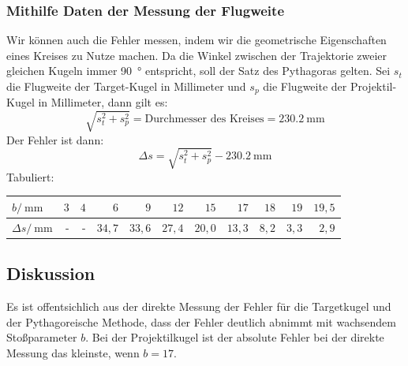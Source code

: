 \documentclass[twoside]{article}
\begin{document}
        \subsubsection{Mithilfe Daten der Messung der Flugweite}
            Wir können auch die Fehler messen, indem wir die geometrische Eigenschaften eines Kreises zu Nutze machen. Da die Winkel zwischen der Trajektorie zweier gleichen Kugeln immer \SI{90}{\degree} entspricht, soll der Satz des Pythagoras gelten. Sei $s_t$ die Flugweite der Target-Kugel in Millimeter und $s_p$ die Flugweite der Projektil-Kugel in Millimeter, dann gilt es:
            \begin{equation}
                \sqrt{s_t^2 + s_p^2} = \text{Durchmesser des Kreises} = \SI{230.2}{\milli\meter}
            \end{equation}
            Der Fehler ist dann:
            \begin{equation}
                \Delta s = \sqrt{s_t^2 + s_p^2} - \SI{230.2}{\milli\meter}
            \end{equation}
            Tabuliert:
            \begin{center}
                \begin{tabular}{l rrrrrrrrrr}
                    \toprule
                    $b / \SI{}{\milli\meter}$ & $3$ & $4$ & $6$ & $9$ & $12$ & $15$ & $17$ & $18$ & $19$ & $19,5$ \\
                    \midrule
                    $\Delta s / \SI{}{\milli\meter}$ & - & - & $34,7$ & $33,6$ & $27,4$ & $20,0$ & $13,3$ & $8,2$ & $3,3$ & $2,9$ \\
                    \bottomrule
                \end{tabular}
            \end{center}

    \subsection{Diskussion}
        Es ist offentsichlich aus der direkte Messung der Fehler für die Targetkugel und der Pythagoreische Methode, dass der Fehler deutlich abnimmt mit wachsendem Stoßparameter $b$. Bei der Projektilkugel ist der absolute Fehler bei der direkte Messung das kleinste, wenn $b = 17$.
\end{document}
